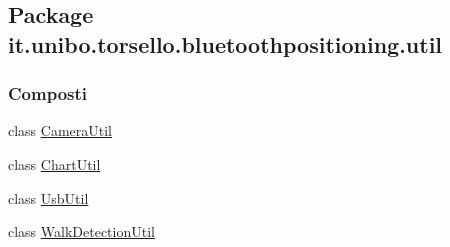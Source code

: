 \hypertarget{namespaceit_1_1unibo_1_1torsello_1_1bluetoothpositioning_1_1util}{}\subsection{Package it.\+unibo.\+torsello.\+bluetoothpositioning.\+util}
\label{namespaceit_1_1unibo_1_1torsello_1_1bluetoothpositioning_1_1util}
\subsubsection*{Composti}
\begin{DoxyCompactItemize}
\item 
class \hyperlink{classit_1_1unibo_1_1torsello_1_1bluetoothpositioning_1_1util_1_1CameraUtil}{Camera\+Util}
\item 
class \hyperlink{classit_1_1unibo_1_1torsello_1_1bluetoothpositioning_1_1util_1_1ChartUtil}{Chart\+Util}
\item 
class \hyperlink{classit_1_1unibo_1_1torsello_1_1bluetoothpositioning_1_1util_1_1UsbUtil}{Usb\+Util}
\item 
class \hyperlink{classit_1_1unibo_1_1torsello_1_1bluetoothpositioning_1_1util_1_1WalkDetectionUtil}{Walk\+Detection\+Util}
\end{DoxyCompactItemize}
